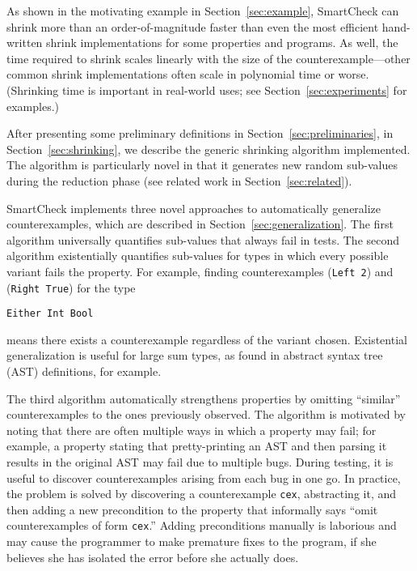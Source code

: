 \documentclass{sigplanconf}
\newenvironment{code}{\begin{alltt}\footnotesize}{\end{alltt}}
\newcommand{\ttp}[1]{\texttt{#1}}
\begin{document}
As shown in the motivating example in Section~\ref{sec:example}, SmartCheck
can shrink more than an order-of-magnitude faster than even the most efficient hand-written
shrink implementations for some properties and programs.  As well, the time
required to shrink scales linearly with the size of the counterexample---other
common shrink implementations often scale in polynomial time or worse.
(Shrinking time is important in real-world uses; see
Section~\ref{sec:experiments} for examples.)

After presenting some preliminary definitions in
Section~\ref{sec:preliminaries}, in Section~\ref{sec:shrinking}, we describe the
generic shrinking algorithm implemented.  The algorithm is particularly novel in
that it generates new random sub-values during the reduction phase (see related
work in Section~\ref{sec:related}).



SmartCheck implements three novel approaches to automatically generalize
counterexamples, which are described in Section~\ref{sec:generalization}.  The
first algorithm universally quantifies sub-values that always fail in tests.
The second algorithm existentially quantifies sub-values for types in which
every possible variant fails the property.  For example, finding counterexamples
(\ttp{Left 2}) and (\ttp{Right True}) for the type
%
\begin{code}
\ttp{Either Int Bool}
\end{code}
%
\noindent
means there exists a counterexample regardless of the variant chosen.
Existential generalization is useful for large sum types, as found in
abstract syntax tree (AST) definitions, for example.

The third algorithm automatically strengthens properties by omitting ``similar''
counterexamples to the ones previously observed.  The algorithm is motivated by
noting that there are often multiple ways in which a property may fail; for
example, a property stating that pretty-printing an AST and then parsing it
results in the original AST may fail due to multiple bugs.  During testing, it
is useful to discover counterexamples arising from each bug in one go.  In
practice, the problem is solved by discovering a counterexample \ttp{cex},
abstracting it, and then adding a new precondition to the property that
informally says ``omit counterexamples of form \ttp{cex}.''  Adding
preconditions manually is laborious and may cause the programmer to make
premature fixes to the program, if she believes she has isolated the error
before she actually does.
\end{document}
